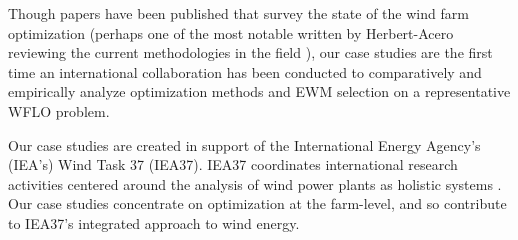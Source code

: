 Though papers have been published that survey the state of the wind farm optimization (perhaps one of the most notable written by Herbert-Acero reviewing the current methodologies in the field \cite{HerbertAcero2014}),
our case studies are the first time an international collaboration has been conducted to comparatively and empirically analyze optimization methods and EWM selection on a representative WFLO problem.



Our case studies are created in support of the International Energy Agency's (IEA's) Wind Task 37 (IEA37).
IEA37 coordinates international research activities centered around the analysis of wind power plants as holistic systems \cite{IEATask372017}. Our case studies concentrate on optimization at the farm-level, and so contribute to IEA37's integrated approach \cite{IEATask372017} to wind energy.
